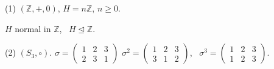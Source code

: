 \documentclass[12pt]{article}
\begin{document}
\noindent (1) $(\mathbb{Z},+,0)$, $H=n\mathbb{Z}$, $n\geq 0$.

\noindent $H$ normal in $\mathbb{Z}$, \ $H\trianglelefteq\mathbb{Z}$.

\noindent (2) $(S_3,\circ)$. \quad $\sigma = \begin{pmatrix}1&2&3\\2&3&1\end{pmatrix}$ \quad $\sigma^2=\begin{pmatrix}1&2&3\\3&1&2\end{pmatrix}$, \ $\sigma^3=\begin{pmatrix}1&2&3\\1&2&3\end{pmatrix}$.
\end{document}

